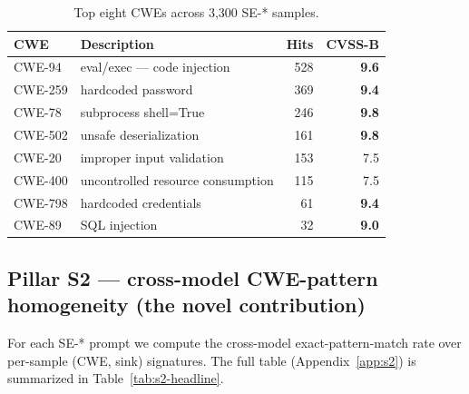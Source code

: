 \documentclass{article}
\begin{document}
\begin{table}[h]
\centering
\small
\begin{tabular}{llrr}
\toprule
CWE & Description & Hits & CVSS-B \\
\midrule
CWE-94  & eval/exec --- code injection       & 528 & \textbf{9.6} \\
CWE-259 & hardcoded password                 & 369 & \textbf{9.4} \\
CWE-78  & subprocess shell=True              & 246 & \textbf{9.8} \\
CWE-502 & unsafe deserialization             & 161 & \textbf{9.8} \\
CWE-20  & improper input validation          & 153 & 7.5 \\
CWE-400 & uncontrolled resource consumption  & 115 & 7.5 \\
CWE-798 & hardcoded credentials              &  61 & \textbf{9.4} \\
CWE-89  & SQL injection                      &  32 & \textbf{9.0} \\
\bottomrule
\end{tabular}
\caption{Top eight CWEs across 3{,}300 SE-* samples.}
\label{tab:topcwes}
\end{table}

\subsection{Pillar S2 --- cross-model CWE-pattern homogeneity (the novel contribution)}
\label{sec:s2}

For each SE-* prompt we compute the cross-model exact-pattern-match rate over
per-sample (CWE, sink) signatures. The full table (Appendix~\ref{app:s2}) is
summarized in Table~\ref{tab:s2-headline}.
\end{document}
